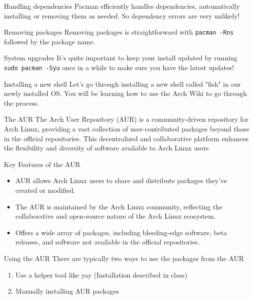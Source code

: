 \documentclass{beamer}
\begin{document}
\begin{frame}{Handling dependencies}
	    Pacman efficiently handles dependencies, automatically installing or removing them as needed. So dependency errors are very unlikely!
\end{frame}

\begin{frame}{Removing packages}
	Removing packages is straightforward with \texttt{pacman -Rns} followed by the package name.
\end{frame}

\begin{frame}{System upgrades}
It's quite important to keep your install updated by running \texttt{sudo pacman -Syu} once in a while to make sure you have the latest updates!
\end{frame}

\begin{frame}{Installing a new shell}
	Let's go through installing a new shell called "fish" in our newly installed OS. You will be learning how to use
	the Arch Wiki to go through the process.
\end{frame}

\begin{frame}{The AUR}
    The Arch User Repository (AUR) is a community-driven repository for Arch Linux, providing a vast collection of user-contributed packages beyond those in the official repositories. This decentralized and collaborative platform enhances the flexibility and diversity of software available to Arch Linux users
\end{frame}

\begin{frame}{Key Features of the AUR}
\begin{itemize}
	\item AUR allows Arch Linux users to share and distribute packages they've created or modified.

	\item     The AUR is maintained by the Arch Linux community, reflecting the collaborative and open-source nature of the Arch Linux ecosystem.

	\item     Offers a wide array of packages, including bleeding-edge software, beta releases, and software not available in the official repositories.
\end{itemize}
\end{frame}

\begin{frame}{Using the AUR}
	There are typically two ways to use the packages from the AUR

	\begin{enumerate}
		\item Use a helper tool like yay (Installation described in class)
		\item Manually installing AUR packages
	\end{enumerate}
\end{frame}
\end{document}
